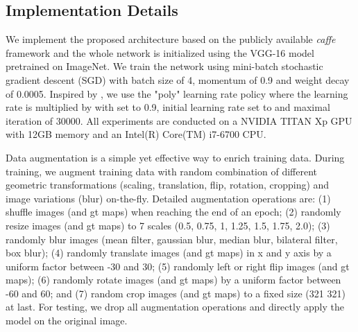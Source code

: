 \documentclass[journal]{IEEEtran}
\begin{document}
\subsection{Implementation Details}
We implement the proposed architecture based on the publicly available \emph{caffe}~\cite{jia2014caffe} framework and the whole network is initialized using the VGG-16 model\cite{russakovsky2015imagenet} pretrained on ImageNet.
We train the network using mini-batch stochastic gradient descent (SGD)\cite{krizhevsky2012imagenet} with batch size of 4, momentum of 0.9 and weight decay of 0.0005.
Inspired by \cite{chen2014semantic}, we use the "poly" learning rate policy where the learning rate is multiplied by  with  set to 0.9, initial learning rate set to  and maximal iteration of 30000. All experiments are conducted on a NVIDIA TITAN Xp GPU with 12GB memory and an Intel(R) Core(TM) i7-6700 CPU.

Data augmentation is a simple yet effective way to enrich training data.
During training, we augment training data with random combination of different geometric transformations (scaling, translation, flip, rotation, cropping) and image variations (blur) on-the-fly. Detailed augmentation operations are:
(1) shuffle images (and gt maps) when reaching the end of an epoch;
(2) randomly resize images (and gt maps) to 7 scales (0.5, 0.75, 1, 1.25, 1.5, 1.75, 2.0);
(3) randomly blur images (mean filter, gaussian blur, median blur, bilateral filter, box blur);
(4) randomly translate images (and gt maps) in x and y axis by a uniform factor between -30 and 30;
(5) randomly left or right flip images (and gt maps);
(6) randomly rotate images (and gt maps) by a uniform factor between -60 and 60;
and (7) random crop images (and gt maps) to a fixed size (321  321) at last.
For testing, we drop all augmentation operations and directly apply the model on the original image.
\end{document}
